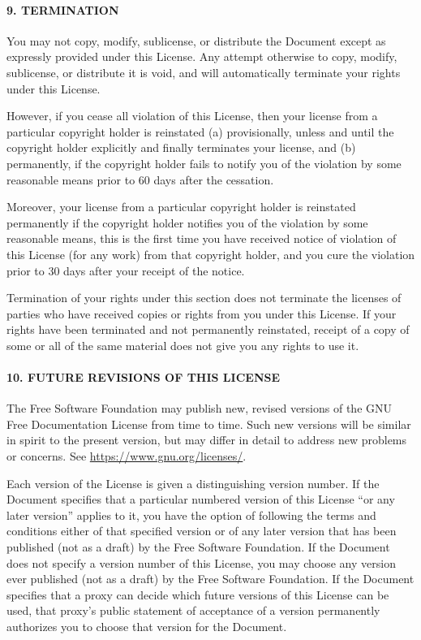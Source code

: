 \hypertarget{termination}{%
\paragraph{9. TERMINATION}\label{termination}}

You may not copy, modify, sublicense, or distribute the Document except
as expressly provided under this License. Any attempt otherwise to copy,
modify, sublicense, or distribute it is void, and will automatically
terminate your rights under this License.

However, if you cease all violation of this License, then your license
from a particular copyright holder is reinstated (a) provisionally,
unless and until the copyright holder explicitly and finally terminates
your license, and (b) permanently, if the copyright holder fails to
notify you of the violation by some reasonable means prior to 60 days
after the cessation.

Moreover, your license from a particular copyright holder is reinstated
permanently if the copyright holder notifies you of the violation by
some reasonable means, this is the first time you have received notice
of violation of this License (for any work) from that copyright holder,
and you cure the violation prior to 30 days after your receipt of the
notice.

Termination of your rights under this section does not terminate the
licenses of parties who have received copies or rights from you under
this License. If your rights have been terminated and not permanently
reinstated, receipt of a copy of some or all of the same material does
not give you any rights to use it.

\hypertarget{future-revisions-of-this-license}{%
\paragraph{10. FUTURE REVISIONS OF THIS
LICENSE}\label{future-revisions-of-this-license}}

The Free Software Foundation may publish new, revised versions of the
GNU Free Documentation License from time to time. Such new versions will
be similar in spirit to the present version, but may differ in detail to
address new problems or concerns. See
\url{https://www.gnu.org/licenses/}.

Each version of the License is given a distinguishing version number. If
the Document specifies that a particular numbered version of this
License ``or any later version'' applies to it, you have the option of
following the terms and conditions either of that specified version or
of any later version that has been published (not as a draft) by the
Free Software Foundation. If the Document does not specify a version
number of this License, you may choose any version ever published (not
as a draft) by the Free Software Foundation. If the Document specifies
that a proxy can decide which future versions of this License can be
used, that proxy's public statement of acceptance of a version
permanently authorizes you to choose that version for the Document.

